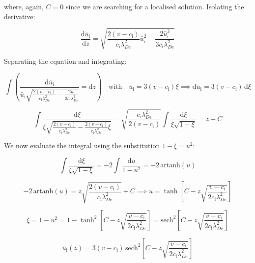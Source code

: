where, again, $C=0$ since we are searching for a localised solution. Isolating the derivative:

\begin{equation}
    \frac{\mathrm{d}\bar{u}_\mathrm{i}}{\mathrm{d}z}=\sqrt{\frac{2(v-c_\mathrm{i})}{c_\mathrm{i}\lambda_{D\text{e}}^2}\bar{u}_\mathrm{i}^2-\frac{2\bar{u}_\mathrm{i}^3}{3c_\mathrm{i}\lambda_{D\text{e}}^2}}
\end{equation}

Separating the equation and integrating:

\begin{equation}
    \int\left(\frac{\mathrm{d}\bar{u}_\mathrm{i}}{\bar{u}_\mathrm{i}\sqrt{\frac{2(v-c_\mathrm{i})}{c_\mathrm{i}\lambda_{D\text{e}}^2}-\frac{2\bar{u}_\mathrm{i}}{3c_\mathrm{i}\lambda_{D\text{e}}^2}}}=\mathrm{d}z\right)\quad\text{with}\quad\bar{u}_\mathrm{i}=3(v-c_\mathrm{i})\xi\implies\mathrm{d}\bar{u}_\mathrm{i}=3(v-c_\mathrm{i})\,\mathrm{d}\xi
\end{equation}

\begin{equation}
    \int\frac{\mathrm{d}\xi}{\xi\sqrt{\frac{2(v-c_\mathrm{i})}{c_\mathrm{i}\lambda_{D\text{e}}^2}-\frac{2(v-c_\mathrm{i})}{c_\mathrm{i}\lambda_{D\text{e}}^2}\xi}}=\sqrt{\frac{c_\mathrm{i}\lambda_{D\text{e}}^2}{2(v-c_\mathrm{i})}}\int\frac{\mathrm{d}\xi}{\xi\sqrt{1-\xi}}=z+C
\end{equation}

We now evaluate the integral using the substitution $1-\xi=u^2$:

\begin{equation}
    \int\frac{\mathrm{d}\xi}{\xi\sqrt{1-\xi}}=-2\int\frac{\mathrm{d}u}{1-u^2}=-2\,\text{artanh}\left(u\right)
\end{equation}

\begin{equation}
    -2\,\text{artanh}(u)=z\sqrt{\frac{2(v-c_\mathrm{i})}{c_\mathrm{i}\lambda_{D\text{e}}^2}}+C\implies u=\tanh{\left[C-z\sqrt{\frac{v-c_\mathrm{i}}{2c_\mathrm{i}\lambda_{D\text{e}}^2}}\right]}
\end{equation}

\begin{equation}
    \xi=1-u^2=1-\tanh^2{\left[C-z\sqrt{\frac{v-c_\mathrm{i}}{2c_\mathrm{i}\lambda_{D\text{e}}^2}}\right]}=\mathrm{sech}^2\left[C-z\sqrt{\frac{v-c_\mathrm{i}}{2c_\mathrm{i}\lambda_{D\text{e}}^2}}\right]
\end{equation}

\begin{equation}
    \bar{u}_\mathrm{i}(z)=3(v-c_\mathrm{i})\,\mathrm{sech}^2\left[C-z\sqrt{\frac{v-c_\mathrm{i}}{2c_\mathrm{i}\lambda_{D\text{e}}^2}}\right]
\end{equation}

